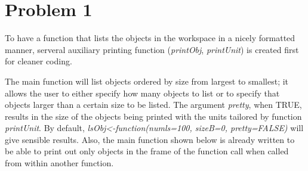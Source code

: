\documentclass{article}
\begin{document}
\section*{Problem 1}

To have a function that lists the objects in the workspace in a nicely formatted manner, serveral auxiliary 
printing function (\textit{printObj}, \textit{printUnit}) is created first for cleaner coding. 


The main function will list objects ordered by size from largest to smallest; it allows the user to 
either specify how many objects to list or to specify that objects larger than a certain size 
to be listed. The argument \textit{pretty}, when TRUE, results in the size of the objects being printed 
with the units tailored by function \textit{printUnit}.
By default, \textit{lsObj<-function(numls=100, sizeB=0, pretty=FALSE)} 
will give sensible results.	
Also, the main function shown below is already written to be able to print out only
objects in the frame of the function call when called from within another function.
\end{document}
